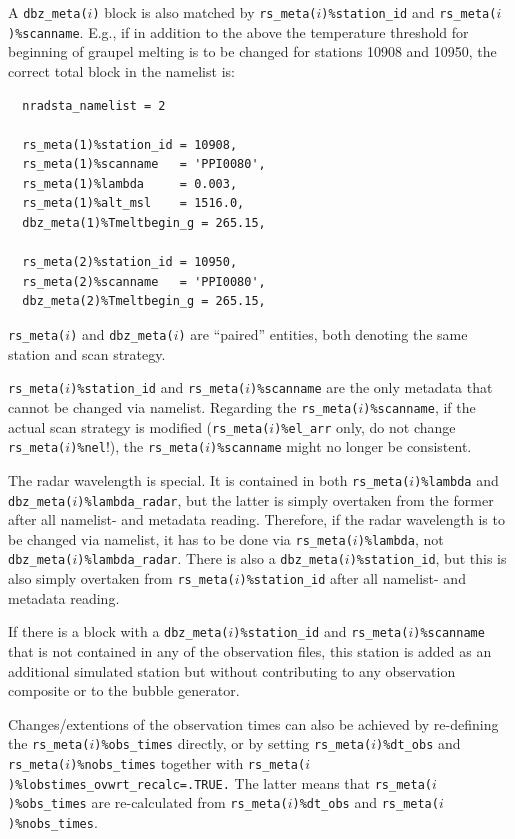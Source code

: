 \documentclass[10pt,a4paper,twoside,headinclude,footinclude,parskip=half]{scrartcl}
\newcommand{\srcform}[1]{\mbox{\texttt{#1}}\xspace}%
\begin{document}
A \srcform{dbz_meta($i$)} block is also matched by
\srcform{rs_meta($i$)\%station_id} and \srcform{rs_meta($i$)\%scanname}. E.g., if in addition to the above the temperature threshold for beginning
of graupel melting is to be changed for stations 10908 and 10950, the correct total block in the namelist is:
\begin{verbatim}
  nradsta_namelist = 2

  rs_meta(1)%station_id = 10908,
  rs_meta(1)%scanname   = 'PPI0080',
  rs_meta(1)%lambda     = 0.003,
  rs_meta(1)%alt_msl    = 1516.0,
  dbz_meta(1)%Tmeltbegin_g = 265.15,

  rs_meta(2)%station_id = 10950,
  rs_meta(2)%scanname   = 'PPI0080',
  dbz_meta(2)%Tmeltbegin_g = 265.15,
\end{verbatim}
\srcform{rs_meta($i$)} and \srcform{dbz_meta($i$)} are ``paired'' entities, both denoting the same station
and scan strategy.

\srcform{rs_meta($i$)\%station_id} and \srcform{rs_meta($i$)\%scanname} are the only
metadata that cannot be changed via namelist. Regarding the \srcform{rs_meta($i$)\%scanname},
if the actual scan strategy is modified (\srcform{rs_meta($i$)\%el_arr} only, do not change \srcform{rs_meta($i$)\%nel}!),
the \srcform{rs_meta($i$)\%scanname} might no longer be consistent.

The radar wavelength is special. It is contained in both \srcform{rs_meta($i$)\%lambda} and \srcform{dbz_meta($i$)\%lambda_radar},
but the latter is simply overtaken from the former after all namelist- and metadata reading.
Therefore, if the radar wavelength is to be changed via namelist, it has to be done
via \srcform{rs_meta($i$)\%lambda}, not \srcform{dbz_meta($i$)\%lambda_radar}.
There is also a \srcform{dbz_meta($i$)\%station_id}, but this is also simply overtaken from 
\srcform{rs_meta($i$)\%station_id} after all namelist- and metadata reading.

If there is a block with a \srcform{dbz_meta($i$)\%station_id} and \srcform{rs_meta($i$)\%scanname} that is not contained in any of the
observation files, this station is added as an additional simulated station but without contributing to any observation composite or to the bubble generator.

Changes/extentions of the observation times can also be achieved by re-defining the \srcform{rs_meta($i$)\%obs_times} directly, or by setting
\srcform{rs_meta($i$)\%dt_obs} and \srcform{rs_meta($i$)\%nobs_times} together with \srcform{rs_meta($i$)\%lobstimes_ovwrt_recalc=.TRUE.} The latter means that
\srcform{rs_meta($i$)\%obs_times} are re-calculated from \srcform{rs_meta($i$)\%dt_obs} and \srcform{rs_meta($i$)\%nobs_times}.
\end{document}
